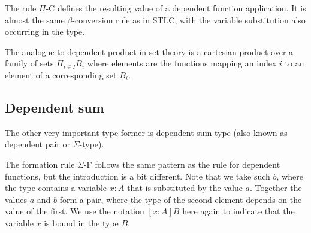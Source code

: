 The rule $\Pi$-C defines the resulting value of a dependent function
application. It is almost the same $\beta$-conversion rule as in STLC, with the
variable substitution also occurring in the type.

The analogue to dependent product in set theory is a cartesian product over a
family of sets $\Pi_{i \in I}B_i$ where elements are the functions mapping an
index $i$ to an element of a corresponding set $B_i$.

\subsection*{Dependent sum}

The other very important type former is dependent sum type (also known as
dependent pair or $\Sigma$-type).

\begin{definition}
\end{definition}

The formation rule $\Sigma$-F follows the same pattern as the rule for
dependent functions, but the introduction is a bit different. Note that we take
such $b$, where the type contains a variable $x : A$ that is substituted by the
value $a$. Together the values $a$ and $b$ form a pair, where the type of the
second element depends on the value of the first. We use the notation $[x : A]
B$ here again to indicate that the variable $x$ is bound in the type $B$.

